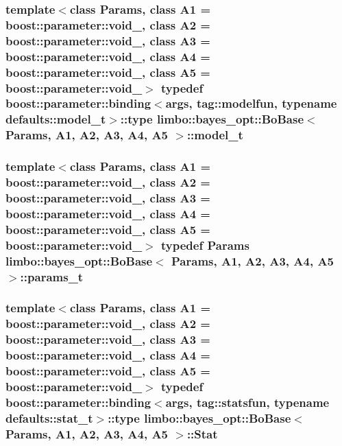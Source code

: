 \subsubsection[{model\+\_\+t}]{\setlength{\rightskip}{0pt plus 5cm}template$<$class Params, class A1 = boost\+::parameter\+::void\+\_\+, class A2 = boost\+::parameter\+::void\+\_\+, class A3 = boost\+::parameter\+::void\+\_\+, class A4 = boost\+::parameter\+::void\+\_\+, class A5 = boost\+::parameter\+::void\+\_\+$>$ typedef boost\+::parameter\+::binding$<${\bf args}, tag\+::modelfun, typename {\bf defaults\+::model\+\_\+t}$>$\+::type {\bf limbo\+::bayes\+\_\+opt\+::\+Bo\+Base}$<$ Params, A1, A2, A3, A4, A5 $>$\+::{\bf model\+\_\+t}}\label{classlimbo_1_1bayes__opt_1_1_bo_base_a1ddc93cc023a2d7d527deb4cc750624e}
\hypertarget{classlimbo_1_1bayes__opt_1_1_bo_base_a3fb955ab00c385f5deb56f3d18211d3d}{}
\subsubsection[{params\+\_\+t}]{\setlength{\rightskip}{0pt plus 5cm}template$<$class Params, class A1 = boost\+::parameter\+::void\+\_\+, class A2 = boost\+::parameter\+::void\+\_\+, class A3 = boost\+::parameter\+::void\+\_\+, class A4 = boost\+::parameter\+::void\+\_\+, class A5 = boost\+::parameter\+::void\+\_\+$>$ typedef Params {\bf limbo\+::bayes\+\_\+opt\+::\+Bo\+Base}$<$ Params, A1, A2, A3, A4, A5 $>$\+::{\bf params\+\_\+t}}\label{classlimbo_1_1bayes__opt_1_1_bo_base_a3fb955ab00c385f5deb56f3d18211d3d}
\hypertarget{classlimbo_1_1bayes__opt_1_1_bo_base_a0da8155a1a5be0999e112655ec3d610e}{}
\subsubsection[{Stat}]{\setlength{\rightskip}{0pt plus 5cm}template$<$class Params, class A1 = boost\+::parameter\+::void\+\_\+, class A2 = boost\+::parameter\+::void\+\_\+, class A3 = boost\+::parameter\+::void\+\_\+, class A4 = boost\+::parameter\+::void\+\_\+, class A5 = boost\+::parameter\+::void\+\_\+$>$ typedef boost\+::parameter\+::binding$<${\bf args}, tag\+::statsfun, typename {\bf defaults\+::stat\+\_\+t}$>$\+::type {\bf limbo\+::bayes\+\_\+opt\+::\+Bo\+Base}$<$ Params, A1, A2, A3, A4, A5 $>$\+::{\bf Stat}}\label{classlimbo_1_1bayes__opt_1_1_bo_base_a0da8155a1a5be0999e112655ec3d610e}
\hypertarget{classlimbo_1_1bayes__opt_1_1_bo_base_a67aac9bd22ae3de346afe7ffe5b564d3}{}
